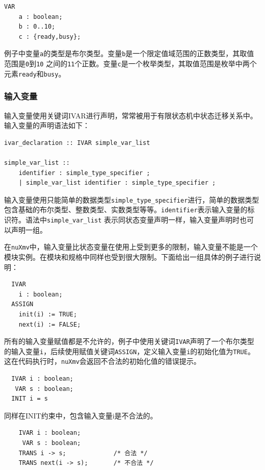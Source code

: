 \begin{lstlisting}
VAR
    a : boolean;
    b : 0..10;
    c : {ready,busy};
\end{lstlisting}

例子中变量\verb|a|的类型是布尔类型。变量\verb|b|是一个限定值域范围的正数类型，其取值范围是\verb|0|到\verb|10| 之间的\verb|11|个正数。变量\verb|c|是一个枚举类型，其取值范围是枚举中两个元素\verb|ready|和\verb|busy|。


\subsubsection{输入变量}
输入变量使用关键词IVAR进行声明，常常被用于有限状态机中状态迁移关系中。输入变量的声明语法如下：

\begin{lstlisting}
ivar_declaration :: IVAR simple_var_list

simple_var_list ::
    identifier : simple_type_specifier ;
    | simple_var_list identifier : simple_type_specifier ;
\end{lstlisting}

输入变量使用只能简单的数据类型\verb|simple_type_specifier|进行，简单的数据类型包含基础的布尔类型、整数类型、实数类型等等。\verb|identifier|表示输入变量的标识符。语法中\verb|simple_var_list| 表示同状态变量声明一样，输入变量声明时也可以声明一组。

在\verb|nuXmv|中，输入变量比状态变量在使用上受到更多的限制，输入变量不能是一个模块实例。在模块和规格中同样也受到很大限制。下面给出一组具体的例子进行说明：

\begin{lstlisting}
  IVAR
    i : boolean;
  ASSIGN
    init(i) := TRUE;
    next(i) := FALSE;
\end{lstlisting}

所有的输入变量赋值都是不允许的，例子中使用关键词\verb|IVAR|声明了一个布尔类型的输入变量\verb|i|，后续使用赋值关键词\verb|ASSIGN|，定义输入变量\verb|i|的初始化值为\verb|TRUE|。 这在代码执行时，\verb|nuXmv|会返回不合法的初始化值的错误提示。

\begin{lstlisting}
  IVAR i : boolean;
   VAR s : boolean;
  INIT i = s
\end{lstlisting}

同样在INIT约束中，包含输入变量i是不合法的。

\begin{lstlisting}
    IVAR i : boolean;
     VAR s : boolean;
    TRANS i -> s;             /* 合法 */
    TRANS next(i -> s);       /* 不合法 */
\end{lstlisting}


